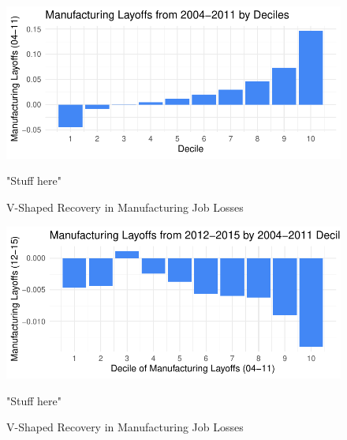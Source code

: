 \documentclass[]{AEA}
\begin{document}
\begin{figure} \label{vShapePlot}
\caption{V-Shaped Recovery in Manufacturing Job Losses}

\begin{center}\includegraphics{Final-Draft_files/figure-latex/unnamed-chunk-10-1} \end{center}
\begin{figurenotes}
"Stuff here"
\end{figurenotes}
\end{figure}

\begin{figure} \label{vShapePlot}
\caption{V-Shaped Recovery in Manufacturing Job Losses}

\begin{center}\includegraphics{Final-Draft_files/figure-latex/unnamed-chunk-11-1} \end{center}

\begin{figurenotes}
"Stuff here"
\end{figurenotes}
\end{figure}
\end{document}
